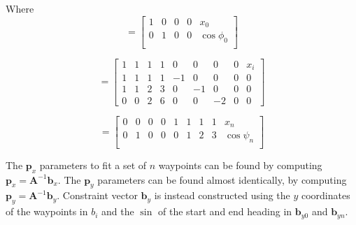 Where
\begin{equation}
[\bm{A}_{0}|\bm{b}_{x0}] = \left[ \begin{array}{cccc|c}
1 & 0 & 0 & 0 & x_0\\
0 & 1 & 0 & 0 & \cos{\phi_0}\\
\end{array} \right] 
\label{eq:submatrix_0}
\end{equation}

\begin{equation}
[\bm{A}_{i}|\bm{b}_{xi}] = \left[\begin{array}{cccccccc|c}
1 & 1 & 1 & 1 & 0 & 0 & 0 & 0 & x_{i}\\
1 & 1 & 1 & 1 & -1 & 0 & 0 & 0 & 0\\
1 & 1 & 2 & 3 & 0 & -1 & 0 & 0 & 0\\
0 & 0 & 2 & 6 & 0 & 0 & -2 & 0 & 0
\end{array}\right]
\label{eq:submatrix_i}
\end{equation}

\begin{equation}
[\bm{A}_{n}|\bm{b}_{xn}] = \left[\begin{array}{cccccccc|c}
0 & 0 & 0 & 0 & 1 & 1 & 1 & 1 &x_n\\
0 & 1 & 0 & 0 & 0 & 1 & 2 & 3 & \cos{\psi_n}\\
\end{array}\right] 
\label{eq:submatrix_n}
\end{equation}

The $\bm{p}_x$ parameters to fit a set of $n$ waypoints can be found by computing $\bm{p}_x = \bm{A}^{-1}\bm{b}_x$. The $\bm{p}_y$ parameters can be found almost identically, by computing $\bm{p}_y=\bm{A}^{-1}\bm{b}_y$. Constraint vector $\bm{b}_y$ is instead constructed using the $y$ coordinates of the waypoints in $b_i$ and the $\sin$ of the start and end heading in $\bm{b}_{y0}$ and $\bm{b}_{yn}$.

